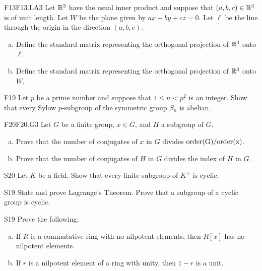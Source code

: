 \documentclass[../AlgebraQualSolutions.tex]{subfiles}
\begin{document}
	\begin{prob}{F13}{F13.LA3}
		Let $\mathbb{R}^3$ have  the usual inner product and suppose that $(a,b,c) \in \mathbb{R}^3$ is of unit length. Let $W$ be the plane given by $ax + by + cz = 0$. Let $\ell$ be the line through the origin in the direction $(a,b,c)$.
		\begin{enumerate}[(a)]
			\item Define the standard matrix representing the orthogonal projection of $\mathbb{R}^3$ onto $\ell$.
			\item Define the standard matrix representing the orthogonal projection of $\mathbb{R}^3$ onto $W$.
		\end{enumerate}
	\end{prob}

	\begin{prob}{F19}{}
	Let $p$ be a prime number and suppose that $1 \leq n <p^2$ is an integer. Show that every Sylow $p$-subgroup of the symmetric group $S_n$ is abelian.
	\end{prob}
	

	\begin{prob}{F20}{F20.G3}
	Let $G$ be a finite group, $x \in G$, and $H$ a subgroup of $G$.
	\begin{enumerate}[(a)]
	\item Prove that the number of conjugates of $x$ in $G$ divides $\rm{order}(G)/\rm{order}(x)$.
	\item Prove that the number of conjugates of $H$ in $G$ divides the index of $H$ in $G$.
	\end{enumerate}
	\end{prob}

	\begin{prob}{S20}{}
	Let $K$ be a field. Show that every finite subgroup of $K^\times$ is cyclic.
	\end{prob}

	\begin{prob}{S19}{}
	State and prove Lagrange's Theorem. Prove that a subgroup of a cyclic group is cyclic.
	\end{prob}

	\begin{prob}{S19}{}
	Prove the following:
	\begin{enumerate}[(a)]
	\item If $R$ is a commutative ring with no nilpotent elements, then $R[x]$ has no nilpotent elements.
	\item If $r$ is a nilpotent element of a ring with unity, then $1 - r$ is a unit.
	\end{enumerate}
	\end{prob}
	
\end{document}
